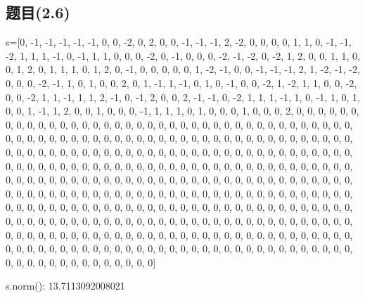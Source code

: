 \documentclass[12pt,a4paper]{article}
\numberwithin{equation}{section}
\begin{document}
\subsection{题目(2.6)}

s=[0, -1, -1, -1, -1, -1, 0, 0, -2, 0, 2, 0, 0, -1, -1, -1, 2, -2, 0, 0, 0, 0, 1, 1, 0, -1, -1, -2, 1, 1, 1, -1, 0, -1, 1, 1, 0, 0, 0, -2, 0, -1, 0, 0, 0, -2, -1, -2, 0, -2, 1, 2, 0, 0, 1, 1, 0, 0, 1, 2, 0, 1, 1, 1, 0, 1, 2, 0, -1, 0, 0, 0, 0, 0, 1, -2, -1, 0, 0, -1, -1, -1, 2, 1, -2, -1, -2, 0, 0, 0, -2, -1, 1, 0, 1, 0, 0, 2, 0, 1, -1, 1, -1, 0, 1, 0, -1, 0, 0, -2, 1, -2, 1, 1, 0, 0, -2, 0, 0, -2, 1, 1, -1, 1, 1, 2, -1, 0, -1, 2, 0, 0, 2, -1, -1, 0, -2, 1, 1, 1, -1, 1, 0, -1, 1, 0, 1, 0, 0, 1, -1, 1, 2, 0, 0, 1, 0, 0, 0, -1, 1, 1, 1, 0, 1, 0, 0, 0, 1, 0, 0, 0, 2, 0, 0, 0, 0, 0, 0, 0, 0, 0, 0, 0, 0, 0, 0, 0, 0, 0, 0, 0, 0, 0, 0, 0, 0, 0, 0, 0, 0, 0, 0, 0, 0, 0, 0, 0, 0, 0, 0, 0, 0, 0, 0, 0, 0, 0, 0, 0, 0, 0, 0, 0, 0, 0, 0, 0, 0, 0, 0, 0, 0, 0, 0, 0, 0, 0, 0, 0, 0, 0, 0, 0, 0, 0, 0, 0, 0, 0, 0, 0, 0, 0, 0, 0, 0, 0, 0, 0, 0, 0, 0, 0, 0, 0, 0, 0, 0, 0, 0, 0, 0, 0, 0, 0, 0, 0, 0, 0, 0, 0, 0, 0, 0, 0, 0, 0, 0, 0, 0, 0, 0, 0, 0, 0, 0, 0, 0, 0, 0, 0, 0, 0, 0, 0, 0, 0, 0, 0, 0, 0, 0, 0, 0, 0, 0, 0, 0, 0, 0, 0, 0, 0, 0, 0, 0, 0, 0, 0, 0, 0, 0, 0, 0, 0, 0, 0, 0, 0, 0, 0, 0, 0, 0, 0, 0, 0, 0, 0, 0, 0, 0, 0, 0, 0, 0, 0, 0, 0, 0, 0, 0, 0, 0, 0, 0, 0, 0, 0, 0, 0, 0, 0, 0, 0, 0, 0, 0, 0, 0, 0, 0, 0, 0, 0, 0, 0, 0, 0, 0, 0, 0, 0, 0, 0, 0, 0, 0, 0, 0, 0, 0, 0, 0, 0, 0, 0, 0, 0, 0, 0, 0, 0, 0, 0, 0, 0, 0, 0, 0, 0, 0, 0, 0, 0, 0, 0, 0, 0, 0, 0, 0, 0, 0, 0, 0, 0, 0, 0, 0, 0, 0, 0, 0, 0, 0, 0, 0, 0, 0, 0, 0, 0, 0, 0, 0, 0, 0, 0, 0, 0, 0, 0, 0, 0, 0, 0, 0, 0, 0, 0, 0, 0, 0, 0, 0, 0, 0, 0, 0, 0, 0, 0, 0, 0, 0, 0, 0, 0, 0, 0, 0, 0, 0, 0, 0, 0, 0, 0, 0, 0, 0, 0, 0, 0, 0, 0, 0, 0, 0, 0, 0]

s.norm(): 13.7113092008021
\end{document}
